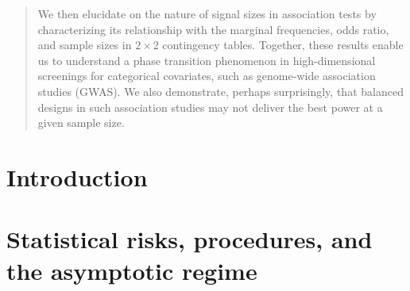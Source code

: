 \documentclass[ejs, preprint]{imsart}
\numberwithin{equation}{section}
\theoremstyle{plain}
\theoremstyle{definition}
\theoremstyle{remark}
\begin{document}
\begin{frontmatter}
\begin{abstract}
We then elucidate on the nature of signal sizes in association tests by characterizing its relationship with the marginal frequencies, odds ratio, and sample sizes in $2\times2$ contingency tables. %
Together, these results enable us to understand a phase transition phenomenon in high-dimensional screenings for categorical covariates, such as genome-wide association studies (GWAS).
We also demonstrate, perhaps surprisingly, that balanced designs in such association studies may {not} deliver the best power at a given sample size. %

\end{abstract}

\begin{keyword}[class=MSC]
\end{keyword}

\begin{keyword}
\end{keyword}
\tableofcontents
\end{frontmatter}

\section{Introduction}
\label{sec:intro}


\section{Statistical risks, procedures, and the asymptotic regime}
\label{sec:setup}

\end{document}
